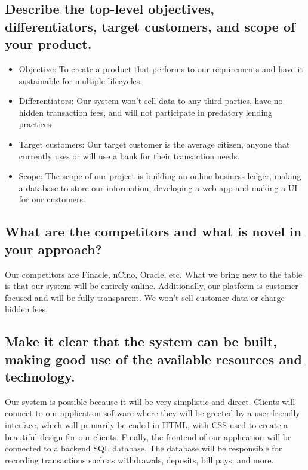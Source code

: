 \documentclass[
10pt, %
a4paper, %
oneside, %
headinclude,footinclude, %
BCOR5mm, %
]{scrartcl}
\begin{document}
\subsection{Describe the top-level objectives, differentiators,
target customers, and scope of your
product.}

\begin{itemize}
\item
  Objective: To create a product that performs to our requirements and
  have it sustainable for multiple lifecycles.
\item
  Differentiators: Our system won't sell data to any third parties, have
  no hidden transaction fees, and will not participate in predatory
  lending practices
\item
  Target customers: Our target customer is the average citizen, anyone
  that currently uses or will use a bank for their transaction needs.
\item
  Scope: The scope of our project is building an online business ledger,
  making a database to store our information, developing a web app and
  making a UI for our customers.
\end{itemize}

\subsection{What are the competitors and what is novel in your
approach?}

Our competitors are Finacle, nCino, Oracle, etc. What we bring new to
the table is that our system will be entirely online. Additionally, our
platform is customer focused and will be fully transparent. We won't
sell customer data or charge hidden fees.

\subsection{Make it clear that the system can be built, making good
use of the available resources and
technology.}

Our system is possible because it will be very simplistic and direct.
Clients will connect to our application software where they will be
greeted by a user-friendly interface, which will primarily be coded in
HTML, with CSS used to create a beautiful design for our clients.
Finally, the frontend of our application will be connected to a backend
SQL database. The database will be responsible for recording
transactions such as withdrawals, deposits, bill pays, and more.
\end{document}
